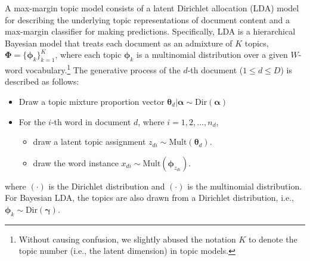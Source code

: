 \documentclass[twoside,11pt]{article}
\newcommand{\thetav}{\bm{\theta}}
\newcommand{\phiv}{\bm{\phi}}
\newcommand{\Phiv}{\bm{\Phi}}
\begin{document}
A max-margin topic model consists of a latent Dirichlet allocation (LDA) model~\citep{blei2003lda}  for describing the underlying topic representations of document content and a max-margin classifier for making predictions. Specifically, LDA is a hierarchical Bayesian model that treats each document as an admixture of $K$ topics, $\Phiv = \{\phiv_k\}_{k=1}^K$, where each topic $\bm{\phi}_k$ is a multinomial distribution over a given $W$-word vocabulary.\footnote{Without causing confusion, we slightly abused the notation $K$ to denote the topic number (i.e., the latent dimension) in topic models.} The generative process of the $d$-th document ($1 \leq d \leq D$) is described as follows:
%
\begin{itemize}
\item Draw a topic mixture proportion vector $\thetav_d | \bm{\alpha} \sim \text{Dir}(\bm{\alpha})$
\item For the $i$-th word in document $d$, where $i = 1, 2, ..., n_d$,
\begin{itemize}
\item draw a latent topic assignment  $z_{di} \sim \text{Mult}(\thetav_d)$.
\item draw the word instance $x_{di} \sim \text{Mult}(\phiv_{z_{di}})$.
\end{itemize}
\end{itemize}
where $(\cdot)$ is the Dirichlet distribution and $(\cdot)$ is the multinomial distribution.
%
For Bayesian LDA, the topics are also drawn from a Dirichlet distribution, i.e., $\bm{\phi}_k \sim \text{Dir}(\bm{\gamma})$.
\end{document}
